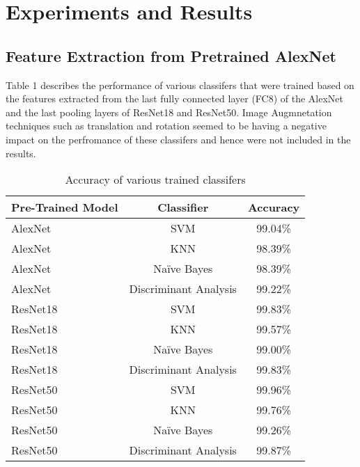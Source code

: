 \documentclass[doc/report.tex]{subfiles}
\begin{document}
\section{Experiments and Results}
\subsection{Feature Extraction from Pretrained AlexNet}
Table 1 describes the performance of various classifers that were trained based on the features extracted from the last fully connected layer (FC8) of the AlexNet and the last pooling layers of ResNet18 and ResNet50. Image Augmnetation techniques such as translation and rotation seemed to be having a negative impact on the perfromance of these classifers and hence were not included in the results.

\begin{table}[h]
\centering
\caption{Accuracy of various trained classifers}
\label{tab:my-table1}
\begin{tabular}{|l|c|c|}
\hline
\multicolumn{1}{|c|}{Pre-Trained Model} & Classifier                                 & Accuracy \\ \hline
AlexNet                                 & SVM                                        & 99.04\%  \\ \hline
AlexNet                                 & KNN                                        & 98.39\%  \\ \hline
AlexNet                                 & Naïve Bayes                                & 98.39\%  \\ \hline
AlexNet                                 & Discriminant Analysis                      & 99.22\%  \\ \hline
ResNet18                                & SVM                                        & 99.83\%  \\ \hline
ResNet18                                & KNN                                        & 99.57\%  \\ \hline
ResNet18                                & Naïve Bayes                                & 99.00\%  \\ \hline
ResNet18                                & Discriminant Analysis                      & 99.83\%  \\ \hline
ResNet50                                & SVM                                        & 99.96\%  \\ \hline
ResNet50                                & KNN                                        & 99.76\%  \\ \hline
ResNet50                                & Naïve Bayes                                & 99.26\%  \\ \hline
ResNet50                                & \multicolumn{1}{l|}{Discriminant Analysis} & 99.87\%  \\ \hline
\end{tabular}%
\end{table}
\end{document}
